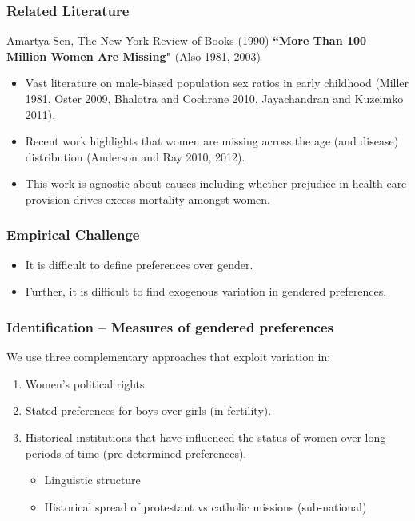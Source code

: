 \documentclass[9pt,letterpaper,subeqn]{beamer}
\begin{document}
\begin{frame}
\frametitle{Related Literature}
Amartya Sen, The New York Review of Books (1990) \textbf{``More Than 100 Million Women Are Missing"} (Also 1981, 2003) \vspace{4mm}
\begin{itemize}
\item Vast literature on male-biased population sex ratios in early childhood (Miller 1981, Oster 2009, Bhalotra and Cochrane 2010, Jayachandran and Kuzeimko 2011).
\item Recent work highlights that women are missing across the age (and disease) distribution (Anderson and Ray 2010, 2012).
\item This work is agnostic about causes including whether prejudice in health care provision drives excess mortality amongst women.
\end{itemize}
\end{frame}

\begin{frame}
  \frametitle{Empirical Challenge}
  \begin{itemize}
  \item It is difficult to define preferences over gender.  
  \item Further, it is difficult to find exogenous variation in gendered preferences.
  \end{itemize}
\end{frame}


\begin{frame}
  \frametitle{Identification -- Measures of gendered preferences}
  We use three complementary approaches that exploit variation in: \vspace{3mm}
  \begin{enumerate}
  \item   Women's political rights. 
  \item   Stated preferences for boys over girls (in fertility).
  \item   Historical institutions that have influenced the status of women over long periods of time (pre-determined preferences).
    \begin{itemize}
    \item Linguistic structure 
    \item Historical spread of protestant vs catholic missions (sub-national)
    \end{itemize}
	\end{enumerate}
\end{frame}
\end{document}
